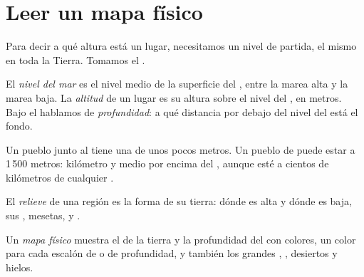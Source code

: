 \section{Leer un mapa físico}

Para decir a qué altura está un lugar, necesitamos un nivel de partida, el
mismo en toda la Tierra. Tomamos el .

\begin{definition}\label{def:g4:world-physical-map:altitude}
El \emph{nivel del mar} es el nivel medio de la
superficie del , entre la marea alta y la marea baja. La
\emph{altitud} de un lugar es su altura sobre el nivel del
, en metros. Bajo el  hablamos de \emph{profundidad}: a qué distancia
por debajo del nivel del  está el fondo.
\end{definition}

Un pueblo junto al  tiene una  de unos pocos metros. Un pueblo de
 puede estar a 1\,500 metros: kilómetro y medio por encima del , aunque esté a cientos de kilómetros de cualquier .

\begin{definition}[Relieve]\label{def:g4:world-physical-map:relief}
El \emph{relieve} de una región es la forma de su tierra:
dónde es alta y dónde es baja, sus , mesetas,  y .
\end{definition}

\begin{definition}\label{def:g4:world-physical-map:physical-map}
Un \emph{mapa físico} muestra el  de
la tierra y la profundidad del  con colores, un color para cada escalón
de  o de profundidad, y también los grandes , , desiertos y
hielos.
\end{definition}

